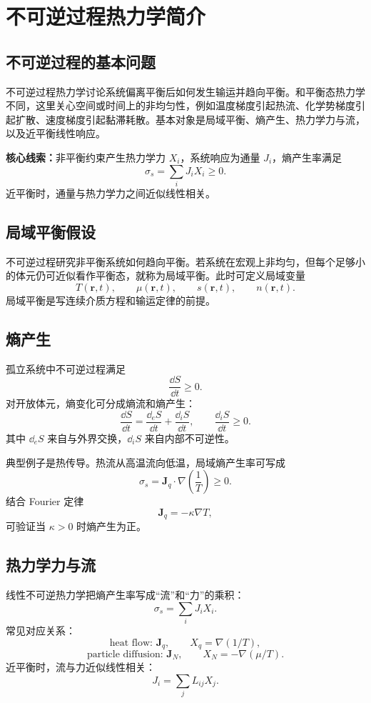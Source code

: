\chapter{不可逆过程热力学简介}

\section{不可逆过程的基本问题}

不可逆过程热力学讨论系统偏离平衡后如何发生输运并趋向平衡。和平衡态热力学不同，这里关心空间或时间上的非均匀性，例如温度梯度引起热流、化学势梯度引起扩散、速度梯度引起黏滞耗散。基本对象是局域平衡、熵产生、热力学力与流，以及近平衡线性响应。

\begin{keybox}
\textbf{核心线索：}非平衡约束产生热力学力 $X_i$，系统响应为通量 $J_i$，熵产生率满足
\[
  \sigma_s=\sum_i J_iX_i\ge 0.
\]
近平衡时，通量与热力学力之间近似线性相关。
\end{keybox}

\section{局域平衡假设}

不可逆过程研究非平衡系统如何趋向平衡。若系统在宏观上非均匀，但每个足够小的体元仍可近似看作平衡态，就称为局域平衡。此时可定义局域变量
\[
  T(\bm r,t),\qquad \mu(\bm r,t),\qquad
  s(\bm r,t),\qquad n(\bm r,t).
\]
局域平衡是写连续介质方程和输运定律的前提。

\section{熵产生}

孤立系统中不可逆过程满足
\[
  \frac{\dd S}{\dd t}\ge 0.
\]
对开放体元，熵变化可分成熵流和熵产生：
\[
  \frac{\dd S}{\dd t}
  =\frac{\dd_e S}{\dd t}+\frac{\dd_i S}{\dd t},
  \qquad
  \frac{\dd_i S}{\dd t}\ge 0.
\]
其中 $\dd_e S$ 来自与外界交换，$\dd_i S$ 来自内部不可逆性。

典型例子是热传导。热流从高温流向低温，局域熵产生率可写成
\[
  \sigma_s=\bm J_q\cdot \nabla\left(\frac{1}{T}\right)\ge 0.
\]
结合 Fourier 定律
\[
  \bm J_q=-\kappa\nabla T,
\]
可验证当 $\kappa>0$ 时熵产生为正。

\section{热力学力与流}

线性不可逆热力学把熵产生率写成“流”和“力”的乘积：
\[
  \sigma_s=\sum_i J_iX_i .
\]
常见对应关系：
\[
  \text{heat flow: } \bm J_q,\qquad
  X_q=\nabla(1/T),
\]
\[
  \text{particle diffusion: } \bm J_N,\qquad
  X_N=-\nabla(\mu/T).
\]
近平衡时，流与力近似线性相关：
\[
  J_i=\sum_j L_{ij}X_j .
\]


